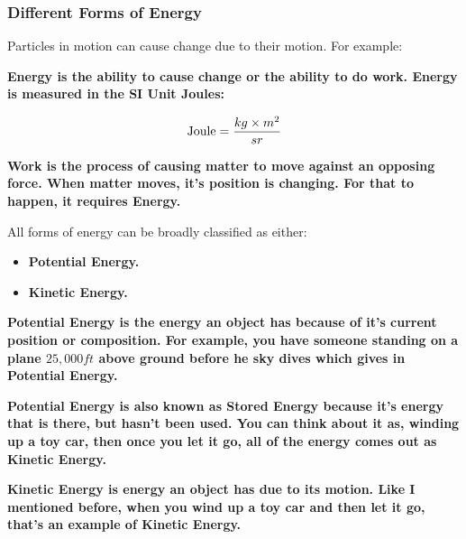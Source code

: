 
\subsubsection*{Different Forms of Energy}

Particles in motion can cause change due to their motion. For example:

\begin{definition}[Energy]
	\bf{Energy} is the ability to cause change or the ability to do work.
	\bf{Energy} is measured in the \bf{SI Unit Joules}:

    \begin{align}
    	\rm{Joule} = \frac{kg \times m^2}{s^^2}
    \end{align}
\end{definition}

\begin{definition}[Work]
	\bf{Work} is the process of causing matter to move against an opposing
	force. When matter moves, it's position is changing. For that to happen, it
	requires \bf{Energy}.
\end{definition}

All forms of energy can be broadly classified as either:

\begin{itemize}
	\item \bf{Potential Energy}.
	\item \bf{Kinetic Energy}.
\end{itemize}

\begin{definition}
	\bf{Potential Energy} is the energy an object has because of it's current
	position or composition. For example, you have someone standing on a plane
	$25,000 ft$ above ground before he sky dives which gives in \bf{Potential Energy}.

	\bf{Potential Energy} is also known as \bf{Stored Energy} because
	it's energy that is there, but hasn't been used. You can think about it as,
	winding up a toy car, then once you let it go, all of the energy comes out as
	\bf{Kinetic Energy}.
\end{definition}

\begin{definition}
	\bf{Kinetic Energy} is energy an object
	has due to its motion. Like I mentioned before, when you wind up a toy car
	and then let it go, that's an example of \bf{Kinetic Energy}.
\end{definition}

